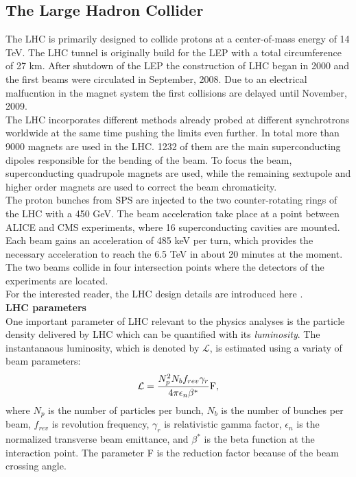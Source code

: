\subsection{The Large Hadron Collider}
The LHC is primarily designed to collide protons at a center-of-mass energy of 14 TeV. The LHC tunnel is originally build for the LEP with a total circumference of 27 km.
After shutdown of the LEP the construction of LHC began in 2000 and the first beams were circulated in September, 2008. Due to an electrical malfucntion in the magnet system the first collisions are delayed until November, 2009. \\
The LHC incorporates different methods already probed at different synchrotrons worldwide at the same time pushing the limits even further. 
In total more than 9000 magnets are used in the LHC. 1232 of them are the main superconducting dipoles responsible for the bending of the beam. To focus the beam, superconducting quadrupole magnets are  used, while the remaining sextupole and higher order magnets are used to correct the beam chromaticity. \\
The proton bunches from SPS are injected to the two counter-rotating rings of the LHC with a 450 GeV. The beam acceleration take place at a point between ALICE and CMS experiments, where 16 superconducting cavities are mounted. Each beam gains an acceleration of 485 keV per turn, which provides the necessary acceleration to reach the 6.5 TeV in about 20 minutes at the moment. \\
The two beams collide in four intersection points where the detectors of the experiments are located.\\
For the interested reader, the LHC design details are introduced here \cite{LHCDR}. \\
\textbf{LHC parameters}\\
One important parameter of LHC relevant to the physics analyses is the particle density delivered by LHC which can be quantified with its {\it luminosity}. The instantanaous luminosity, which is denoted by $\mathcal{L}$, is estimated using a variaty of beam parameters:
\begin{equation}
  \label{eqn:Lum_inst}
  \mathcal{L} = \frac{N^2_pN_bf_{rev}\gamma_r}{4\pi\epsilon_n\beta^*}\rm F,
\end{equation}
where $N_p$ is the number of particles per bunch, $N_b$ is the number of bunches per beam, $f_{rev}$ is revolution frequency, $\gamma_r$ is relativistic gamma factor, $\epsilon_n$ is the normalized transverse beam emittance, and $\beta^*$ is the beta function at the interaction point. The parameter F is the reduction factor because of the beam crossing angle.\\
